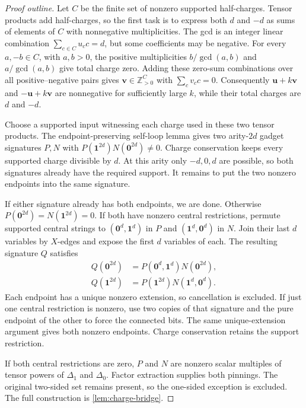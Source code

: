 \documentclass[11pt,letterpaper,onecolumn]{article}
\theoremstyle{plain}
\theoremstyle{definition}
\theoremstyle{remark}
\newcommand{\one}{\mathbf 1}
\newcommand{\zero}{\mathbf 0}
\begin{document}
\begin{proof}[Proof outline]
Let \(C\) be the finite set of nonzero supported half-charges. Tensor
products add half-charges, so the first task is to express both \(d\) and
\(-d\) as sums of elements of \(C\) with nonnegative multiplicities.
The gcd is an integer linear combination
\(\sum_{c\in C}u_cc=d\), but some coefficients may be negative.
For every \(a,-b\in C\), with \(a,b>0\), the positive multiplicities
\(b/\gcd(a,b)\) and \(a/\gcd(a,b)\) give total charge zero.
Adding these zero-sum combinations over all positive--negative pairs
gives \(\mathbf v\in\mathbb Z_{>0}^C\) with \(\sum_cv_cc=0\).
Consequently \(\mathbf u+k\mathbf v\) and \(-\mathbf u+k\mathbf v\)
are nonnegative for sufficiently large \(k\), while their total charges
are \(d\) and \(-d\).

Choose a supported input witnessing each charge used in these two tensor
products. The endpoint-preserving self-loop lemma
\cite[full version, Lemma~40]{MengWangXiaZheng2025} gives two
arity-\(2d\) gadget signatures \(P,N\) with
\(P(\one^{2d})N(\zero^{2d})\ne0\). Charge conservation keeps every
supported charge divisible by \(d\). At this arity only \(-d,0,d\)
are possible, so both signatures already have the required support.
It remains to put the two nonzero endpoints into the same signature.

If either signature already has both endpoints, we are done. Otherwise
\(P(\zero^{2d})=N(\one^{2d})=0\). If both have nonzero central
restrictions, permute supported central strings to
\((\zero^d,\one^d)\) in \(P\) and \((\one^d,\zero^d)\) in \(N\).
Join their last \(d\) variables by \(X\)-edges and expose the first
\(d\) variables of each. The resulting signature \(Q\) satisfies
\[
\begin{split}
Q(\zero^{2d})&=P(\zero^d,\one^d)N(\zero^{2d}),\\
Q(\one^{2d})&=P(\one^{2d})N(\one^d,\zero^d).
\end{split}
\]
Each endpoint has a unique nonzero extension, so cancellation is
excluded. If just one central restriction is nonzero, use two copies of
that signature and the pure endpoint of the other to force the connected
bits. The same unique-extension argument gives both nonzero endpoints.
Charge conservation retains the support restriction.

If both central restrictions are zero, \(P\) and \(N\) are nonzero
scalar multiples of tensor powers of \(\Delta_1\) and \(\Delta_0\).
Factor extraction supplies both pinnings. The original two-sided set
remains present, so the one-sided exception is excluded. The full
construction is \cref{lem:charge-bridge}.
\end{proof}
\end{document}
